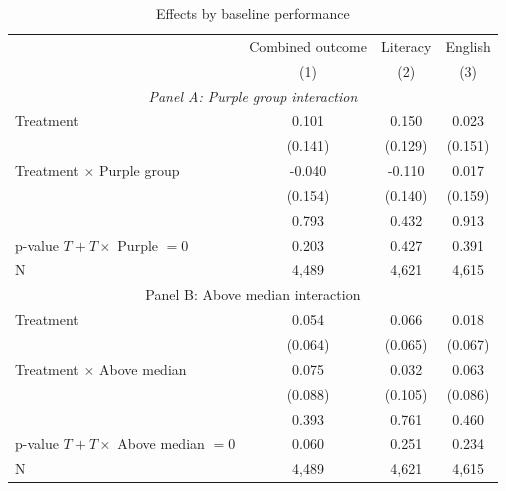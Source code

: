 \begin{table}[htbp]
  \centering
  \caption{Effects by baseline performance}
    \begin{tabular}{lccc}
    \toprule
    \toprule
          & Combined outcome & Literacy & English \\
          & (1)   & (2)   & (3) \\
    \midrule
    \multicolumn{4}{c}{\textit{Panel A: Purple group interaction}} \\
    Treatment & 0.101 & 0.150 & 0.023 \\
          & (0.141) & (0.129) & (0.151) \\
    Treatment $\times$ Purple group & -0.040 & -0.110 & 0.017 \\
          & (0.154) & (0.140) & (0.159) \\
          & 0.793 & 0.432 & 0.913 \\
    \midrule
    p-value $T+T\times$ Purple $= 0$  & 0.203 & 0.427 & 0.391 \\
    N     & 4,489 & 4,621 & 4,615 \\
    \midrule
    \multicolumn{4}{c}{Panel B: Above median interaction} \\
    Treatment & 0.054 & 0.066 & 0.018 \\
          & (0.064) & (0.065) & (0.067) \\
    Treatment $\times$ Above median & 0.075 & 0.032 & 0.063 \\
          & (0.088) & (0.105) & (0.086) \\
          & 0.393 & 0.761 & 0.460 \\
    \midrule
    p-value $T+T\times$ Above median $= 0$  & 0.060 & 0.251 & 0.234 \\
    N     & 4,489 & 4,621 & 4,615 \\
    \bottomrule
    \bottomrule
    \end{tabular}%
  \label{tab:effectsbygroup}%
\end{table}%